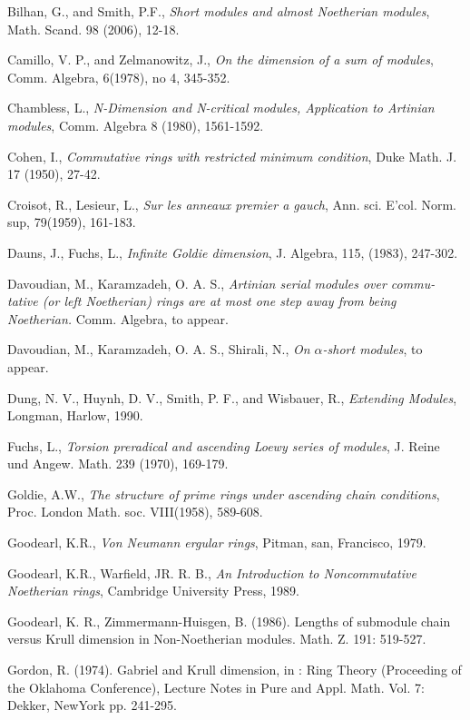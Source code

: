 \begin{thebibliography}{47}
Bilhan, G., and Smith, P.F., {\it Short modules and almost Noetherian modules}, Math. Scand. 98 (2006), 12-18.

 Camillo, V. P., and Zelmanowitz, J., {\em On the dimension of a sum of modules}, Comm. Algebra, 6(1978), no 4, 345-352.

Chambless, L., {\it N-Dimension and N-critical modules, Application to Artinian
modules}, Comm. Algebra 8 (1980), 1561-1592.

Cohen, I., {\it Commutative rings with restricted minimum condition}, Duke Math. J. 17 (1950), 27-42.

Croisot, R., Lesieur, L., {\it Sur les anneaux premier a gauch}, Ann. sci. E'col. Norm. sup, 79(1959), 161-183.

Dauns, J., Fuchs, L., {\it Infinite Goldie dimension}, J. Algebra, 115, (1983), 247-302.

Davoudian, M., Karamzadeh, O. A. S., 
{\it Artinian serial modules over commu-
tative (or left Noetherian) rings are at most one step away from being Noetherian.}
Comm. Algebra, to appear.

Davoudian, M., Karamzadeh, O. A. S., Shirali, N., {\it On $\alpha$-short modules}, to appear. 

Dung, N. V., Huynh, D. V., Smith, P. F., and Wisbauer, R., {\em Extending Modules}, Longman, Harlow, 1990.

Fuchs, L., {\it Torsion preradical and ascending Loewy series of modules},
J. Reine und Angew. Math. 239 (1970), 169-179.

Goldie, A.W., {\it The structure of prime rings under ascending chain conditions}, Proc. London Math. soc. VIII(1958), 589-608.

Goodearl, K.R., {\it Von Neumann ergular rings}, Pitman, san, Francisco, 1979.

Goodearl, K.R., Warfield, JR. R. B., {\it An Introduction to Noncommutative Noetherian rings}, Cambridge University Press, 1989.

Goodearl, K. R., Zimmermann-Huisgen, B. (1986). Lengths of submodule chain
versus Krull dimension in Non-Noetherian modules. Math. Z. 191: 519-527.

Gordon, R. (1974). Gabriel and Krull dimension, in : Ring Theory (Proceeding of
the Oklahoma Conference), Lecture Notes in Pure and Appl. Math. Vol. 7: Dekker,
NewYork pp. 241-295.


\end{thebibliography}
